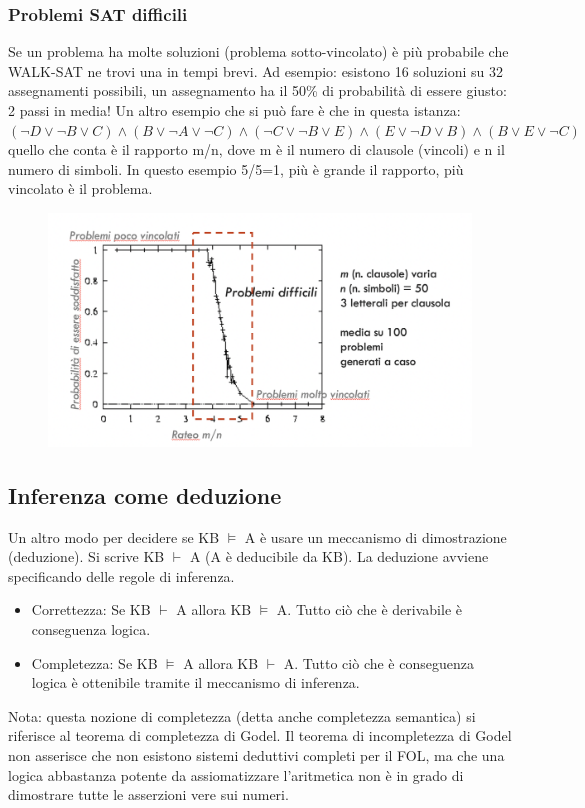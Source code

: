 \documentclass{article}
\begin{document}
\subsubsection{Problemi SAT difficili}
Se un problema ha molte soluzioni (problema sotto-vincolato) è più probabile che WALK-SAT ne trovi una in tempi brevi. Ad esempio: esistono 16 soluzioni su 32 assegnamenti possibili, un assegnamento ha il 50\% di probabilità di essere giusto: 2 passi in media!
Un altro esempio che si può fare è che in questa istanza: \newline $(\neg D \lor \neg B \lor C) \land (B \lor \neg A \lor \neg C) \land (\neg C \lor \neg B \lor E) \land (E \lor \neg D \lor B) \land (B \lor E \lor \neg C)$ \newline quello che conta è il rapporto m/n, dove m è il numero di clausole (vincoli) e n il numero di simboli. In questo esempio 5/5=1, più è grande il rapporto, più vincolato è il problema.
\begin{figure}[h!]
\centering
\includegraphics[scale=0.35]{Images/rateomn.png}
\end{figure}
\subsection{Inferenza come deduzione}
Un altro modo per decidere se KB $\models$ A è usare un meccanismo di dimostrazione (deduzione). Si scrive KB $\vdash$ A  (A è deducibile da KB). La deduzione avviene specificando delle regole di inferenza.
\begin{itemize}
    \item Correttezza: Se KB $\vdash$ A allora KB $\models$ A. Tutto ciò che è derivabile è conseguenza logica.
    \item Completezza: Se KB $\models$ A allora KB $\vdash$ A. Tutto ciò che è conseguenza logica è ottenibile tramite il meccanismo di inferenza.
\end{itemize}
Nota: questa nozione di completezza (detta anche completezza semantica) si riferisce al teorema di completezza di Godel. Il teorema di incompletezza di Godel non asserisce che non esistono sistemi deduttivi completi per il FOL, ma che una logica abbastanza potente da assiomatizzare l’aritmetica non è in grado di dimostrare tutte le asserzioni vere sui numeri.
\end{document}
